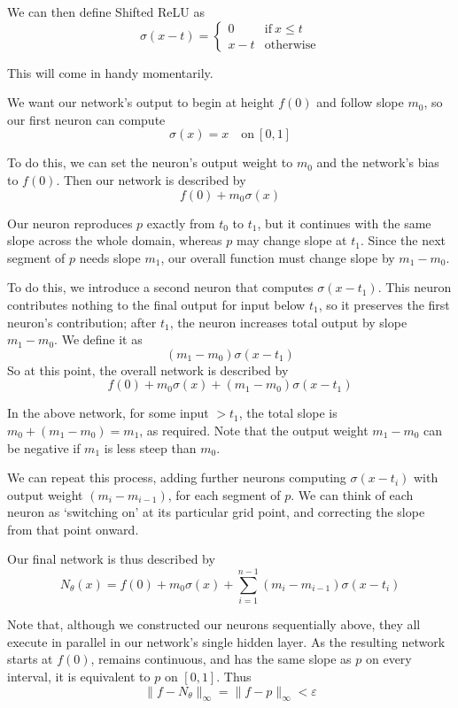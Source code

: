 \documentclass{article}
\theoremstyle{definition}
\begin{document}
We can then define Shifted ReLU as
$$\sigma(x - t) = \begin{cases}
    0& \text{if}\ x \le t \\
    x - t& \text{otherwise}
\end{cases}$$

This will come in handy momentarily.

We want our network's output to begin at height $f(0)$ and follow slope $m_0$, so our first neuron can compute
$$\sigma(x) = x \quad \text{on}\ [0, 1]$$

To do this, we can set the neuron's output weight to $m_0$ and the network's bias to $f(0)$. Then our network is described by
$$f(0) + m_0 \sigma(x)$$

Our neuron reproduces $p$ exactly from $t_0$ to $t_1$, but it continues with the same slope across the whole domain, whereas $p$ may change slope at $t_1$. Since the next segment of $p$ needs slope $m_1$, our overall function must change slope by $m_1 - m_0$.

To do this, we introduce a second neuron that computes $\sigma(x-t_1)$. This neuron contributes nothing to the final output for input below $t_1$, so it preserves the first neuron's contribution; after $t_1$, the neuron increases total output by slope $m_1-m_0$. We define it as
$$(m_1-m_0)\sigma(x-t_1)$$
So at this point, the overall network is described by
$$f(0) + m_0\sigma(x) + (m_1-m_0)\sigma(x-t_1)$$

In the above network, for some input $>t_1$, the total slope is $m_0 + (m_1-m_0) = m_1$, as required. Note that the output weight $m_1-m_0$ can be negative if $m_1$ is less steep than $m_0$.

We can repeat this process, adding further neurons computing $\sigma(x-t_i)$ with output weight $(m_i-m_{i-1})$, for each segment of $p$. We can think of each neuron as `switching on' at its particular grid point, and correcting the slope from that point onward.

Our final network is thus described by
$$N_\theta(x) = f(0) + m_0\sigma(x) + \sum^{n-1}_{i=1}(m_i-m_{i-1})\sigma(x-t_i)$$

Note that, although we constructed our neurons sequentially above, they all execute in parallel in our network's single hidden layer. As the resulting network starts at $f(0)$, remains continuous, and has the same slope as $p$ on every interval, it is equivalent to $p$ on $[0, 1]$. Thus
$$\|f-N_\theta\|_\infty = \|f-p\|_\infty < \varepsilon$$

\end{document}
